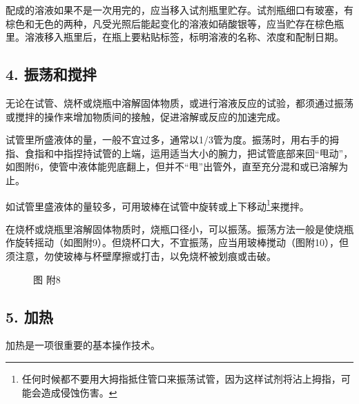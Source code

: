 配成的溶液如果不是一次用完的，应当移入试剂瓶里贮存。试剂瓶细口有玻塞，有棕色和无色的两种，凡受光照后能起变化的溶液如硝酸银等，应当贮存在棕色瓶里。溶液移入瓶里后，在瓶上要粘贴标签，标明溶液的名称、浓度和配制日期。

\subsection{4. 振荡和搅拌}

无论在试管、烧杯或烧瓶中溶解固体物质，或进行溶液反应的试验，都须通过振荡或搅拌的操作来增加物质间的接触，促进溶解或反应的加速完成。

试管里所盛液体的量，一般不宜过多，通常以1/3管为度。振荡时，用右手的拇指、食指和中指捏持试管的上端，运用适当大小的腕力，把试管底部来回``甩动''，如图附6，使管中液体能兜底翻上，但并不``甩''出管外，直至充分混和或已溶解为止。

如试管里盛液体的量较多，可用玻棒在试管中旋转或上下移动\footnote{任何时候都不要用大拇指抵住管口来振荡试管，因为这样试剂将沾上拇指，可能会造成侵蚀伤害。}来搅拌。

在烧杯或烧瓶里溶解固体物质时，烧瓶口径小，可以振荡。振荡方法一般是使烧瓶作旋转摇动（如图附9）。但烧杯口大，不宜振荡，应当用玻棒搅动（图附10），但须注意，勿使玻棒与杯壁摩擦或打击，以免烧杯被划痕或击破。

\begin{figure}
\centering
\caption{图 附8}
\end{figure}

\subsection{5. 加热}

加热是一项很重要的基本操作技术。

